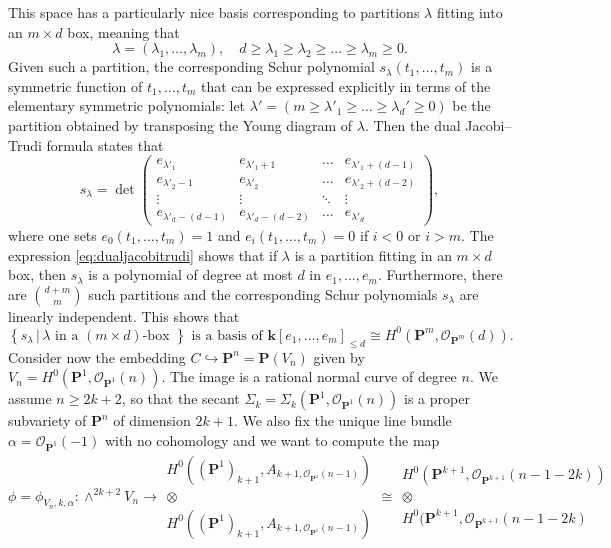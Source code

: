 \documentclass[12pt]{amsart}
\numberwithin{equation}{section}
\numberwithin{thmcounter}{section}
\theoremstyle{definition}
\theoremstyle{claim}
\newcommand{\kk}{\mathbf{k}}
\newcommand{\nP}{\mathbf{P}}
\newcommand{\sO}{\mathscr{O}}
\begin{document}
	This space has a particularly nice basis corresponding to partitions $\lambda$ fitting into an $m\times d$ box, meaning that
	\[ \lambda = (\lambda_1,\dots,\lambda_m), \quad d\geq \lambda_1 \geq \lambda_2  \geq \dots \geq \lambda_m \geq 0. \]
	Given such a partition, the corresponding Schur polynomial $s_{\lambda}(t_1,\dots,t_m)$ is a symmetric function of $t_1,\dots,t_m$ that can be expressed explicitly in terms of the elementary symmetric polynomials: let $\lambda' = (m\geq \lambda'_1 \geq \dots \geq \lambda_d' \geq 0)$ be the partition obtained by transposing the Young diagram of $\lambda$. Then the dual Jacobi--Trudi formula states that
	\begin{equation}\label{eq:dualjacobitrudi}
		s_{\lambda} =
		\det
		\begin{pmatrix}
			e_{\lambda'_1} & e_{\lambda'_1+1} & \dots & e_{\lambda'_1+(d-1)} \\
			e_{\lambda'_2-1} & e_{\lambda'_2} & \dots & e_{\lambda'_2+(d-2)} \\
			\vdots & \vdots & \ddots & \vdots \\
			e_{\lambda'_d-(d-1)} & e_{\lambda'_d-(d-2)} & \dots & e_{\lambda'_d}
		\end{pmatrix},
	\end{equation}
	where one sets $e_0(t_1,\dots,t_m)=1$ and $e_{i}(t_1,\dots,t_m)=0$ if $i<0$ or $i>m$. The expression \eqref{eq:dualjacobitrudi} shows that if $\lambda$ is a partition fitting in an $m\times d$ box, then $s_{\lambda}$ is a polynomial of degree at most $d$ in $e_1,\dots,e_m$. Furthermore, there are $\binom{d+m}{m}$ such partitions and the corresponding Schur polynomials $s_{\lambda}$ are linearly independent. This shows that
	\[ \left\{ s_{\lambda} \,|\, \lambda \text{ in a } (m\times d)\text{-box } \right\} \text{ is a basis of } \kk[e_1,\dots,e_m]_{\leq d} \cong H^0(\nP^m,\sO_{\nP^m}(d)). \]
	Consider now the embedding $C\hookrightarrow \nP^n = \nP(V_n)$ given by $V_n = H^0(\nP^1,\sO_{\nP^1}(n))$. The image is a rational normal curve of degree $n$. We assume $n\geq 2k+2$, so that the secant $\Sigma_k=\Sigma_k(\nP^1,\sO_{\nP^1}(n))$ is a proper subvariety of $\nP^n$ of dimension $2k+1$. We also fix the unique line bundle $\alpha=\sO_{\nP^1}(-1)$ with no cohomology and we want to compute the map  
	\[ \phi=\phi_{V_n,k,\alpha} \colon \wedge^{2k+2}V_n \longrightarrow \begin{matrix} H^0((\nP^1)_{k+1},A_{k+1,\sO_{\nP^1}(n-1)}) \\ \otimes \\ H^0((\nP^1)_{k+1},A_{k+1,\sO_{\nP^1}(n-1)}) \end{matrix} \cong 
	\begin{matrix} H^0(\nP^{k+1},\sO_{\nP^{k+1}}(n-1-2k)) \\ \otimes \\ H^0(\nP^{k+1},\sO_{\nP^{k+1}}(n-1-2k) \end{matrix}\] 
\end{document}
